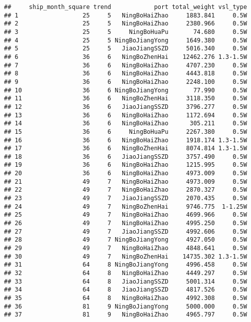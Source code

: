 \documentclass[]{article}
\begin{document}
\begin{verbatim}
##     ship_month_square trend            port total_weight vsl_type
## 1                  25     5   NingBoHaiZhao     1883.841     0.5W
## 2                  25     5   NingBoHaiZhao     2380.966     0.5W
## 3                  25     5     NingBoHuaPu       74.680     0.5W
## 4                  25     5 NingBoJiangYong     1649.380     0.5W
## 5                  25     5   JiaoJiangSSZD     5016.340     0.5W
## 6                  36     6   NingBoZhenHai    12462.276 1.3-1.5W
## 7                  36     6   NingBoHaiZhao     4707.230     0.5W
## 8                  36     6   NingBoHaiZhao     4443.818     0.5W
## 9                  36     6   NingBoHaiZhao     2248.100     0.5W
## 10                 36     6 NingBoJiangYong       77.990     0.5W
## 11                 36     6   NingBoZhenHai     3118.350     0.5W
## 12                 36     6   JiaoJiangSSZD     3796.277     0.5W
## 13                 36     6   NingBoHaiZhao     1172.694     0.5W
## 14                 36     6   NingBoHaiZhao      305.211     0.5W
## 15                 36     6     NingBoHuaPu     2267.380     0.5W
## 16                 36     6   NingBoHaiZhao     1918.174 1.3-1.5W
## 17                 36     6   NingBoZhenHai     8074.814 1.3-1.5W
## 18                 36     6   JiaoJiangSSZD     3757.490     0.5W
## 19                 36     6   NingBoHaiZhao     1215.995     0.5W
## 20                 36     6   NingBoHaiZhao     4973.009     0.5W
## 21                 49     7   NingBoHaiZhao     4973.009     0.5W
## 22                 49     7   NingBoHaiZhao     2870.327     0.5W
## 23                 49     7   JiaoJiangSSZD     2070.435     0.5W
## 24                 49     7   NingBoZhenHai     9746.775  1-1.25W
## 25                 49     7   NingBoHaiZhao     4699.966     0.5W
## 26                 49     7   NingBoHaiZhao     4995.250     0.5W
## 27                 49     7   JiaoJiangSSZD     4992.606     0.5W
## 28                 49     7 NingBoJiangYong     4927.050     0.5W
## 29                 49     7   NingBoHaiZhao     4848.641     0.5W
## 30                 49     7   NingBoZhenHai    14735.302 1.3-1.5W
## 31                 64     8 NingBoJiangYong     4996.458     0.5W
## 32                 64     8   NingBoHaiZhao     4449.297     0.5W
## 33                 64     8   JiaoJiangSSZD     5001.314     0.5W
## 34                 64     8   JiaoJiangSSZD     4817.526     0.5W
## 35                 64     8   NingBoHaiZhao     4992.308     0.5W
## 36                 81     9 NingBoJiangYong     5000.000     0.5W
## 37                 81     9   NingBoHaiZhao     4965.797     0.5W

\end{verbatim}
\end{document}
